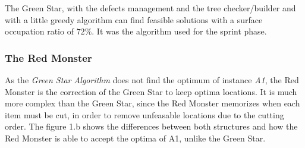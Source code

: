 \documentclass{article}
\begin{document}
The Green Star, with the defects management and the tree checker/builder and with a little greedy algorithm can find feasible solutions with a surface occupation ratio of $72\%$. It was the algorithm used for the sprint phase.

        \subsubsection{The Red Monster}
As the \textit{Green Star Algorithm} does not find the optimum of instance \textit{A1}, the Red Monster is the correction of the Green Star to keep optima locations. It is much more complex than the Green Star, since the Red Monster memorizes when each item must be cut, in order to remove unfeasable locations due to the cutting order.
The figure 1.b shows the differences between both structures and how the Red Monster is able to accept the optima of A1, unlike the Green Star.
\end{document}
